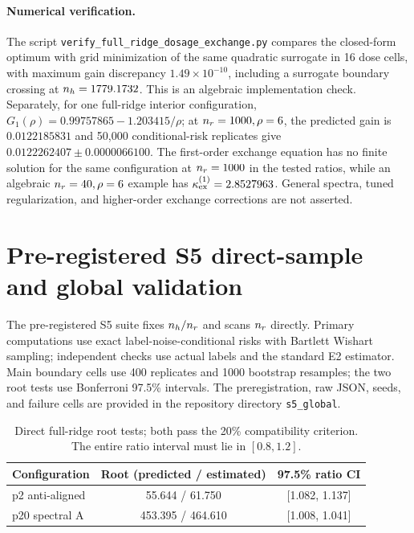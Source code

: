 \paragraph{Numerical verification.}
The script \texttt{verify\_full\_ridge\_dosage\_exchange.py} compares the closed-form optimum with grid minimization of the same quadratic surrogate in 16 dose cells, with maximum gain discrepancy $1.49\times10^{-10}$, including a surrogate boundary crossing at $n_h=1779.1732$. This is an algebraic implementation check. Separately, for one full-ridge interior configuration, $G_1(\rho)=0.99757865-1.203415/\rho$; at $n_r=1000,\rho=6$, the predicted gain is $0.0122185831$ and 50{,}000 conditional-risk replicates give $0.0122262407\pm0.0000066100$. The first-order exchange equation has no finite solution for the same configuration at $n_r=1000$ in the tested ratios, while an algebraic $n_r=40,\rho=6$ example has $\kappa_{\mathrm{ex}}^{(1)}=2.8527963$. General spectra, tuned regularization, and higher-order exchange corrections are not asserted.

\section{Pre-registered S5 direct-sample and global validation}
\label{supp:s5}

The pre-registered S5 suite fixes $n_h/n_r$ and scans $n_r$ directly. Primary computations use exact label-noise-conditional risks with Bartlett Wishart sampling; independent checks use actual labels and the standard E2 estimator. Main boundary cells use 400 replicates and 1000 bootstrap resamples; the two root tests use Bonferroni 97.5\% intervals. The preregistration, raw JSON, seeds, and failure cells are provided in the repository directory \texttt{s5\_global}.

\begin{table}[h]
  \centering
  \footnotesize
  \caption{Direct full-ridge root tests; both pass the 20\% compatibility criterion. The entire ratio interval must lie in $[0.8,1.2]$.}
  \label{supp:tab:s5roots}
  \begin{tabular}{lcc}
    \toprule
    Configuration & Root (predicted / estimated) & 97.5\% ratio CI \\
    \midrule
    p2 anti-aligned & 55.644 / 61.750 & [1.082, 1.137] \\
    p20 spectral A & 453.395 / 464.610 & [1.008, 1.041] \\
    \bottomrule
  \end{tabular}
\end{table}

